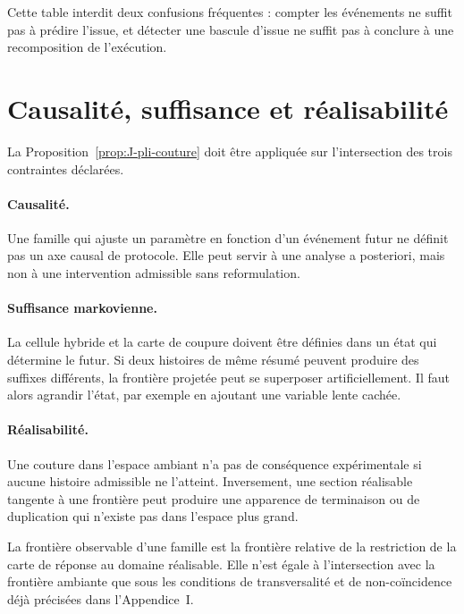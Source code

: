 Cette table interdit deux confusions fréquentes : compter les événements
ne suffit pas à prédire l'issue, et détecter une bascule d'issue ne suffit
pas à conclure à une recomposition de l'exécution.

\section{Causalité, suffisance et réalisabilité}
\label{annexe-J-coherence-domaines}

La Proposition~\ref{prop:J-pli-couture} doit être appliquée sur l'intersection des trois
contraintes déclarées.

\paragraph{Causalité.}
Une famille qui ajuste un paramètre en fonction d'un événement futur ne
définit pas un axe causal de protocole. Elle peut servir à une analyse
a posteriori, mais non à une intervention admissible sans reformulation.

\paragraph{Suffisance markovienne.}
La cellule hybride et la carte de coupure doivent être définies dans un
état qui détermine le futur. Si deux histoires de même résumé peuvent
produire des suffixes différents, la frontière projetée peut se
superposer artificiellement. Il faut alors agrandir l'état, par exemple
en ajoutant une variable lente cachée.

\paragraph{Réalisabilité.}
Une couture dans l'espace ambiant n'a pas de conséquence expérimentale
si aucune histoire admissible ne l'atteint. Inversement, une section
réalisable tangente à une frontière peut produire une apparence de
terminaison ou de duplication qui n'existe pas dans l'espace plus grand.

\begin{encadre}[title={Corollaire \theproposition{} --- Restriction au domaine réalisable}]
La frontière observable d'une famille est la frontière relative de la
restriction de la carte de réponse au domaine réalisable. Elle n'est
égale à l'intersection avec la frontière ambiante que sous les conditions
de transversalité et de non-coïncidence déjà précisées dans
l'Appendice~I.
\end{encadre}

